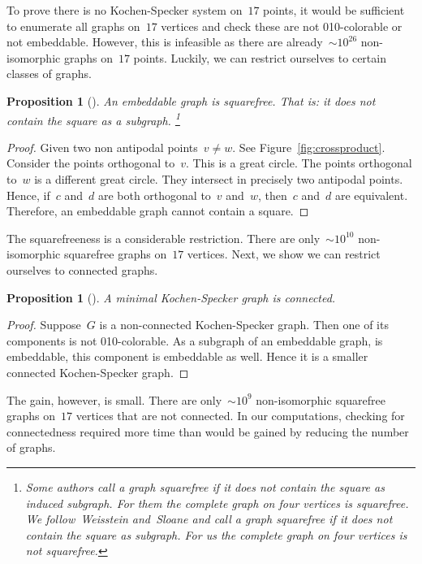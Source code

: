 \documentclass[adraft,copyright,creativecommons]{eptcs}
\newcounter{main}
\newtheorem{prop}[main]{Proposition}
\theoremstyle{definition}
\theoremstyle{remark}
\begin{document}
To prove there is no Kochen-Specker system on~$17$ points,
it would be sufficient to enumerate all graphs on~$17$ vertices
and check these are not 010-colorable or not embeddable.
However, this is infeasible as there are
already~${\sim}10^{26}$ non-isomorphic
graphs on~$17$ points.\cite{oeisA000088}
Luckily, we can restrict ourselves to certain classes of graphs.
\begin{prop}[\cite{aow11}]
    An embeddable graph is squarefree.
    That is: it does not contain the square as a subgraph.%
    \footnote{Some authors call a graph squarefree if it does not
        contain the square as induced subgraph.
        For them the complete graph on four vertices is squarefree.
        We follow~Weisstein\cite{sf-weisstein} and~Sloane\cite{sf-sloane} and
        call a graph squarefree if it does not
        contain the square as subgraph.
        For us the complete graph on four vertices is not squarefree.}
\end{prop}
\begin{proof}
    Given two non antipodal points~$v\neq w$.
    See Figure~\ref{fig:crossproduct}.
    Consider the points orthogonal to~$v$.
    This is a great circle.
    The points orthogonal to~$w$ is a different great circle.
    They intersect in precisely two antipodal points.
    Hence, if~$c$ and~$d$ are both orthogonal to~$v$ and~$w$,
    then~$c$ and~$d$ are equivalent.
    Therefore, an embeddable graph cannot contain a square.
\end{proof}
The squarefreeness is a considerable restriction.  There are
only~${\sim}10^{10}$ non-isomorphic squarefree graphs on~$17$
vertices.\cite{sf-sloane}
Next, we show we can restrict ourselves to connected graphs.
\begin{prop}[\cite{aow11}]\label{prop:ks-conn}
    A minimal Kochen-Specker graph is connected.
\end{prop}
\begin{proof}
    Suppose~$G$ is a non-connected Kochen-Specker graph.
    Then one of its components is not 010-colorable.
    As a subgraph of an embeddable graph, is embeddable,
    this component is embeddable as well.
    Hence it is a smaller connected Kochen-Specker graph.
\end{proof}
The gain, however, is small.
There are only~${\sim}10^9$ non-isomorphic squarefree graphs on~$17$
vertices that are not connected.
In our computations, checking for connectedness
required more time than would be gained by reducing the number of graphs.
\end{document}
